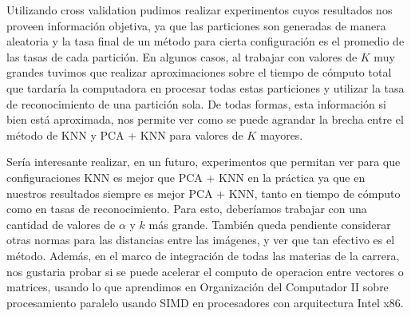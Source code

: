 Utilizando cross validation pudimos realizar experimentos cuyos resultados nos proveen información objetiva, ya que las particiones son generadas de manera aleatoria y la tasa final de un método para cierta configuración es el promedio de las tasas de cada partición. En algunos casos, al trabajar con valores de $K$ muy grandes tuvimos que realizar aproximaciones sobre el tiempo de cómputo total que tardaría la computadora en procesar todas estas particiones y utilizar la tasa de reconocimiento de una partición sola. De todas formas, esta información si bien está aproximada, nos permite ver como se puede agrandar la brecha entre el método de KNN y PCA + KNN para valores de $K$ mayores.

Sería interesante realizar, en un futuro, experimentos que permitan ver para que configuraciones KNN es mejor que PCA + KNN en la práctica ya que en nuestros resultados siempre es mejor PCA + KNN, tanto en tiempo de cómputo como en tasas de reconocimiento. Para esto, deberíamos trabajar con una cantidad de valores de $\alpha$ y $k$ más grande. También queda pendiente considerar otras normas para las distancias entre las imágenes, y ver que tan efectivo es el método. Además, en el marco de integración de todas las materias de la carrera, nos gustaria probar si se puede acelerar el computo de operacion entre vectores o matrices, usando lo que aprendimos en Organización del Computador II sobre procesamiento paralelo usando SIMD en procesadores con arquitectura Intel x86.

